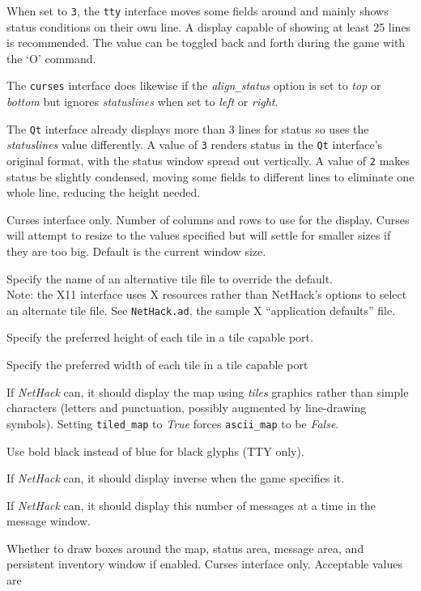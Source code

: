 When set to {\tt 3}, the {\tt tty} interface moves some fields around and
mainly shows status conditions on their own line.
A display capable of showing at least 25 lines is recommended.
The value can be toggled back and forth during the game with the `O'
command.

The {\tt curses} interface does likewise if the
{\it align\verb+_+status\/}
option is set to {\it top\/} or {\it bottom\/} but ignores
{\it statuslines\/}
when set to {\it left\/} or {\it right}.

The {\tt Qt} interface already displays more than 3 lines for status
so uses the
{\it statuslines\/}
value differently.
A value of {\tt 3} renders status in the {\tt Qt} interface's
original format, with the status window spread out vertically.
A value of {\tt 2} makes status be slightly condensed, moving some
fields to different lines to eliminate one whole line, reducing the
height needed.
\item[\ib{term\verb+_+cols} {\normalfont and}]
\item[\ib{term\verb+_+rows}]
Curses interface only.
Number of columns and rows to use for the display.
Curses will attempt to resize to the values specified but will settle
for smaller sizes if they are too big.
Default is the current window size.
\item[\ib{tile\verb+_+file}]
Specify the name of an alternative tile file to override the default.
\\
Note: the X11 interface uses X resources rather than NetHack's options
to select an alternate tile file.
See {\tt NetHack.ad}, the sample X ``application defaults'' file.
\item[\ib{tile\verb+_+height}]
Specify the preferred height of each tile in a tile capable port.
\item[\ib{tile\verb+_+width}]
Specify the preferred width of each tile in a tile capable port
\item[\ib{tiled\verb+_+map}]
If {\it NetHack\/} can, it should display the map using {\it tiles} graphics
rather than simple characters (letters and punctuation, possibly
augmented by line-drawing symbols).
Setting {\tt tiled\verb+_+map} to {\it True\/} forces
{\tt ascii\verb+_+map} to be {\it False}.
\item[\ib{use\verb+_+darkgray}]
Use bold black instead of blue for black glyphs (TTY only).
\item[\ib{use\verb+_+inverse}]
If {\it NetHack\/} can, it should display inverse when the game specifies it.
\item[\ib{vary\verb+_+msgcount}]
If {\it NetHack\/} can, it should display this number of messages at a time
in the message window.
\item[\ib{windowborders}]
Whether to draw boxes around the map, status area, message area, and
persistent inventory window if enabled.
Curses interface only.
Acceptable values are

